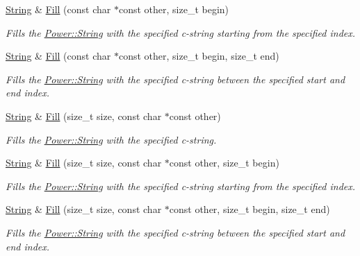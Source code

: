 \begin{DoxyCompactItemize}
\hyperlink{class_power_1_1_string}{String} \& \hyperlink{class_power_1_1_string_a8bbc67bacb2a655a92bd259a5541117d}{Fill} (const char $\ast$const other, size\+\_\+t begin)
\begin{DoxyCompactList}\small\item\em Fills the \hyperlink{class_power_1_1_string}{Power\+::\+String} with the specified c-\/string starting from the specified index. \end{DoxyCompactList}\item 
\hyperlink{class_power_1_1_string}{String} \& \hyperlink{class_power_1_1_string_a886afa62973aceb383e0560c3b6043f7}{Fill} (const char $\ast$const other, size\+\_\+t begin, size\+\_\+t end)
\begin{DoxyCompactList}\small\item\em Fills the \hyperlink{class_power_1_1_string}{Power\+::\+String} with the specified c-\/string between the specified start and end index. \end{DoxyCompactList}\item 
\hyperlink{class_power_1_1_string}{String} \& \hyperlink{class_power_1_1_string_a83ffb462f4a3f5d744af6efa20b2a4e0}{Fill} (size\+\_\+t size, const char $\ast$const other)
\begin{DoxyCompactList}\small\item\em Fills the \hyperlink{class_power_1_1_string}{Power\+::\+String} with the specified c-\/string. \end{DoxyCompactList}\item 
\hyperlink{class_power_1_1_string}{String} \& \hyperlink{class_power_1_1_string_a24f67a1ae4fb15313eadfaeb736e88e7}{Fill} (size\+\_\+t size, const char $\ast$const other, size\+\_\+t begin)
\begin{DoxyCompactList}\small\item\em Fills the \hyperlink{class_power_1_1_string}{Power\+::\+String} with the specified c-\/string starting from the specified index. \end{DoxyCompactList}\item 
\hyperlink{class_power_1_1_string}{String} \& \hyperlink{class_power_1_1_string_a93ee58108b4f325b162b9042643b2491}{Fill} (size\+\_\+t size, const char $\ast$const other, size\+\_\+t begin, size\+\_\+t end)
\begin{DoxyCompactList}\small\item\em Fills the \hyperlink{class_power_1_1_string}{Power\+::\+String} with the specified c-\/string between the specified start and end index. \end{DoxyCompactList}\item 

\end{DoxyCompactItemize}
